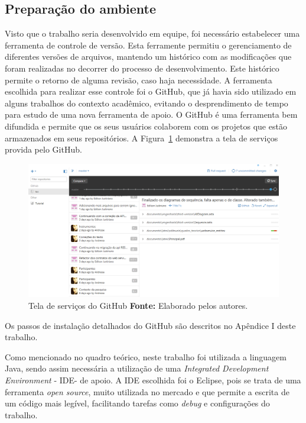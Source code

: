 \subsection{Preparação do ambiente}

\par Visto que o trabalho seria desenvolvido em equipe, foi necessário estabelecer uma ferramenta de controle de versão. Esta ferramente permitiu o gerenciamento de diferentes versões de arquivos, mantendo um histórico com as modificações que foram realizadas no decorrer do processo de desenvolvimento. Este histórico permite o retorno de alguma revisão, caso haja necessidade. A ferramenta escolhida para realizar esse controle foi o GitHub, que já havia sido utilizado em alguns trabalhos do contexto acadêmico, evitando o desprendimento de tempo para estudo de uma nova ferramenta de apoio. O GitHub é uma ferramenta bem difundida e permite que os seus usuários colaborem com os projetos que estão armazenados em seus repositórios\footnotemark[31]. A Figura~\ref{fig:github_inicio} demonstra a tela de serviços provida pelo GitHub.


\begin{figure}[h!]
	\centerline{\includegraphics[scale=0.3]{./imagens/github.jpg}}
	\caption[Tela de serviços do GitHub ]
	{Tela de serviços do GitHub \textbf{Fonte:} Elaborado pelos autores.}
	\label{fig:github_inicio}
\end{figure}

\par Os passos de instalação detalhados do GitHub são descritos  no Apêndice I deste trabalho.

\par Como mencionado no quadro teórico, neste trabalho foi utilizada a linguagem Java, sendo assim necessária a utilização de uma \textit{Integrated Development Environment} - IDE\footnotemark[32] - de apoio. A IDE escolhida foi o Eclipse, pois se trata de uma ferramenta \textit{open source}, muito utilizada no mercado e que permite a escrita de um código mais legível, facilitando tarefas como \textit{debug} e configurações do trabalho.

